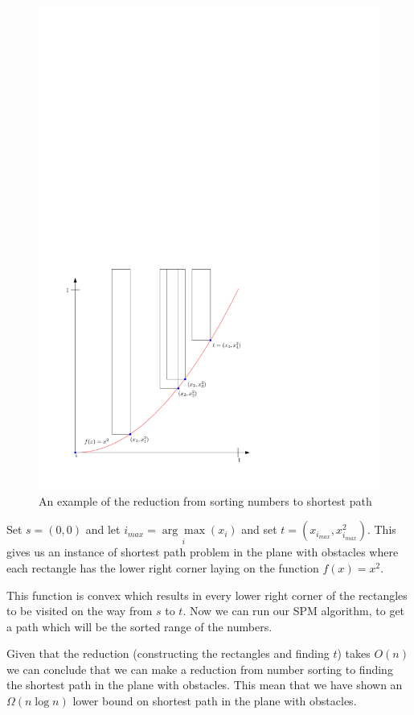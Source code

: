 \begin{figure}[H]
	\includegraphics{figures/reduction.pdf}
	\caption{An example of the reduction from sorting numbers to shortest path}
	\label{fig:reduction}
\end{figure}

Set $s=(0,0)$ and let
$i_{max}=\underset{i}{\arg\max}(x_i)$ and set $t=(x_{i_{max}},x_{i_{max}}^2)$.
This gives us an instance of shortest path problem in the plane with obstacles where
each rectangle has the lower right corner laying on the
function $f(x)=x^2$. 

This function is convex which results in every lower right corner of the
rectangles to be visited on the way from $s$ to $t$. Now we can run our SPM
algorithm, to get a path which will be the sorted range of the numbers.

Given that the reduction (constructing the rectangles and finding $t$) takes
$O(n)$ we can conclude that we can make a reduction from number sorting to
finding the shortest path in the plane with obstacles. This mean that we have
shown an $\Omega{(n\log n)}$ lower bound on shortest path in the plane with obstacles.
